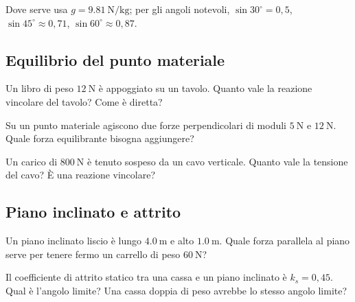 Dove serve usa $g = \SI{9,81}{\newton\per\kilo\gram}$; per gli angoli notevoli, $\sin 30^\circ = 0,5$, $\sin 45^\circ \approx 0,71$, $\sin 60^\circ \approx 0,87$.

\subsection*{Equilibrio del punto materiale}

\begin{esercizio}
Un libro di peso $\SI{12}{\newton}$ è appoggiato su un tavolo. Quanto vale la reazione vincolare del tavolo? Come è diretta?\\
\end{esercizio}

\begin{esercizio}
Su un punto materiale agiscono due forze perpendicolari di moduli $\SI{5}{\newton}$ e $\SI{12}{\newton}$. Quale forza equilibrante bisogna aggiungere?\\
\end{esercizio}

\begin{esercizio}
Un carico di $\SI{800}{\newton}$ è tenuto sospeso da un cavo verticale. Quanto vale la tensione del cavo? È una reazione vincolare?\\
\end{esercizio}

\subsection*{Piano inclinato e attrito}

\begin{esercizio}
Un piano inclinato liscio è lungo $\SI{4,0}{\meter}$ e alto $\SI{1,0}{\meter}$. Quale forza parallela al piano serve per tenere fermo un carrello di peso $\SI{60}{\newton}$?\\
\end{esercizio}

\begin{esercizio}
Il coefficiente di attrito statico tra una cassa e un piano inclinato è $k_s = 0,45$. Qual è l'angolo limite? Una cassa doppia di peso avrebbe lo stesso angolo limite?\\
\end{esercizio}

